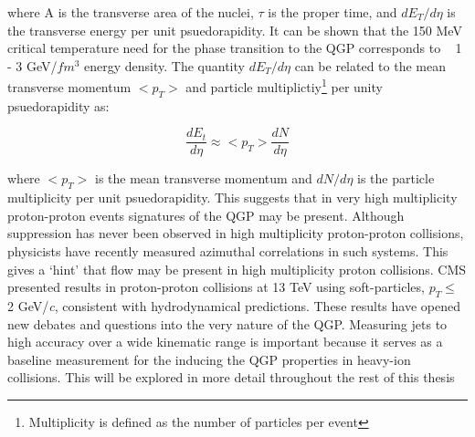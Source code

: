 \noindent
where A is the transverse area of the nuclei, $\tau$ is the proper time, and $dE_{T}/d \eta$ is the transverse energy per unit psuedorapidity.  It can be shown that  the 150 MeV critical temperature need for the phase transition to the QGP corresponds to ~ 1 - 3 GeV/$fm^{3}$ energy density.  The quantity $dE_{T}/d \eta$ can be related to the mean transverse momentum $<p_{T}>$ and particle multiplictiy\footnote{Multiplicity is defined as the number of particles per event} per unity psuedorapidity as:

\begin{equation}
\frac{dE_{t}}{d \eta}  \approx  <p_{T}> \frac{dN}{d\eta}
\label{eq:Et}
\end{equation}

where $ <p_{T} >$ is the mean transverse momentum and $dN/d\eta$ is the particle multiplicity per unit psuedorapidity.  This suggests that in very high multiplicity proton-proton events signatures of the QGP may be present.  Although suppression has never been observed in high multiplicity proton-proton collisions, physicists have recently measured azimuthal correlations in such systems\cite{Nagle:2018nvi}.  This gives a `hint' that flow may be present in high multiplicity proton collisions.  CMS presented results in proton-proton collisions at 13 TeV using soft-particles, $p_{T} \leq\,$ 2 GeV/\textit{c}, consistent with hydrodynamical predictions\cite{ZHAO2018495}. These results have opened new debates and questions into the very nature of the QGP.  Measuring jets to high accuracy over a wide kinematic range is important because it serves as a baseline measurement for the inducing the QGP properties in heavy-ion collisions.  This will be explored in more detail throughout the rest of this thesis